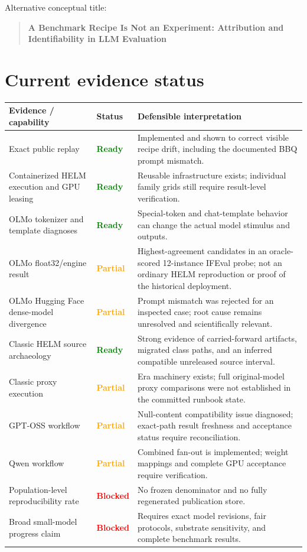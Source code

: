 \documentclass[11pt]{article}
\newcommand{\code}[1]{\texttt{\detokenize{#1}}}
\newcommand{\ready}{\textcolor{green}{\textbf{Ready}}}
\newcommand{\partstat}{\textcolor{orange}{\textbf{Partial}}}
\newcommand{\blocked}{\textcolor{red}{\textbf{Blocked}}}
\begin{document}
Alternative conceptual title:

\begin{quote}
\textbf{A Benchmark Recipe Is Not an Experiment: Attribution and Identifiability in LLM Evaluation}
\end{quote}

\section{Current evidence status}

\begin{longtable}{@{}P{0.29\textwidth}P{0.13\textwidth}P{0.49\textwidth}@{}}
\toprule
Evidence / capability & Status & Defensible interpretation \\
\midrule
Exact public \code{run_spec.json} replay & \ready & Implemented and shown to correct visible recipe drift, including the documented BBQ prompt mismatch. \\
Containerized HELM execution and GPU leasing & \ready & Reusable infrastructure exists; individual family grids still require result-level verification. \\
OLMo tokenizer and template diagnoses & \ready & Special-token and chat-template behavior can change the actual model stimulus and outputs. \\
OLMo float32/engine result & \partstat & Highest-agreement candidates in an oracle-scored 12-instance IFEval probe; not an ordinary HELM reproduction or proof of the historical deployment. \\
OLMo Hugging Face dense-model divergence & \partstat & Prompt mismatch was rejected for an inspected case; root cause remains unresolved and scientifically relevant. \\
Classic HELM source archaeology & \ready & Strong evidence of carried-forward artifacts, migrated class paths, and an inferred compatible unreleased source interval. \\
Classic proxy execution & \partstat & Era machinery exists; full original-model proxy comparisons were not established in the committed runbook state. \\
GPT-OSS workflow & \partstat & Null-content compatibility issue diagnosed; exact-path result freshness and acceptance status require reconciliation. \\
Qwen workflow & \partstat & Combined fan-out is implemented; weight mappings and complete GPU acceptance require verification. \\
Population-level reproducibility rate & \blocked & No frozen denominator and no fully regenerated publication store. \\
Broad small-model progress claim & \blocked & Requires exact model revisions, fair protocols, substrate sensitivity, and complete benchmark results. \\
\bottomrule
\end{longtable}
\end{document}
